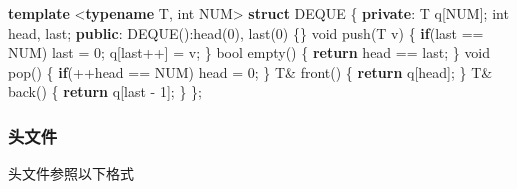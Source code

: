 \documentclass[
]{article}
\newenvironment{Shaded}{}{}
\newcommand{\ControlFlowTok}[1]{\textcolor[rgb]{0.00,0.44,0.13}{\textbf{#1}}}
\newcommand{\DataTypeTok}[1]{\textcolor[rgb]{0.56,0.13,0.00}{#1}}
\newcommand{\DecValTok}[1]{\textcolor[rgb]{0.25,0.63,0.44}{#1}}
\newcommand{\KeywordTok}[1]{\textcolor[rgb]{0.00,0.44,0.13}{\textbf{#1}}}
\newcommand{\NormalTok}[1]{#1}
\newcommand{\OperatorTok}[1]{\textcolor[rgb]{0.40,0.40,0.40}{#1}}
\begin{document}
\begin{Shaded}
\begin{Highlighting}[]
\KeywordTok{template} \OperatorTok{\textless{}}\KeywordTok{typename}\NormalTok{ T}\OperatorTok{,} \DataTypeTok{int}\NormalTok{ NUM}\OperatorTok{\textgreater{}} \KeywordTok{struct}\NormalTok{ DEQUE }\OperatorTok{\{}
\KeywordTok{private}\OperatorTok{:}
\NormalTok{    T q}\OperatorTok{[}\NormalTok{NUM}\OperatorTok{];} \DataTypeTok{int}\NormalTok{ head}\OperatorTok{,}\NormalTok{ last}\OperatorTok{;}
\KeywordTok{public}\OperatorTok{:}
\NormalTok{    DEQUE}\OperatorTok{():}\NormalTok{head}\OperatorTok{(}\DecValTok{0}\OperatorTok{),}\NormalTok{ last}\OperatorTok{(}\DecValTok{0}\OperatorTok{)} \OperatorTok{\{\}}
    \DataTypeTok{void}\NormalTok{ push}\OperatorTok{(}\NormalTok{T v}\OperatorTok{)} \OperatorTok{\{}
        \ControlFlowTok{if}\OperatorTok{(}\NormalTok{last }\OperatorTok{==}\NormalTok{ NUM}\OperatorTok{)}\NormalTok{ last }\OperatorTok{=} \DecValTok{0}\OperatorTok{;}
\NormalTok{        q}\OperatorTok{[}\NormalTok{last}\OperatorTok{++]} \OperatorTok{=}\NormalTok{ v}\OperatorTok{;}
    \OperatorTok{\}}
    \DataTypeTok{bool}\NormalTok{ empty}\OperatorTok{()} \OperatorTok{\{} \ControlFlowTok{return}\NormalTok{ head }\OperatorTok{==}\NormalTok{ last}\OperatorTok{;} \OperatorTok{\}}
    \DataTypeTok{void}\NormalTok{ pop}\OperatorTok{()} \OperatorTok{\{} \ControlFlowTok{if}\OperatorTok{(++}\NormalTok{head }\OperatorTok{==}\NormalTok{ NUM}\OperatorTok{)}\NormalTok{ head }\OperatorTok{=} \DecValTok{0}\OperatorTok{;} \OperatorTok{\}}
\NormalTok{    T}\OperatorTok{\&}\NormalTok{ front}\OperatorTok{()} \OperatorTok{\{} \ControlFlowTok{return}\NormalTok{ q}\OperatorTok{[}\NormalTok{head}\OperatorTok{];} \OperatorTok{\}}
\NormalTok{    T}\OperatorTok{\&}\NormalTok{ back}\OperatorTok{()} \OperatorTok{\{} \ControlFlowTok{return}\NormalTok{ q}\OperatorTok{[}\NormalTok{last }\OperatorTok{{-}} \DecValTok{1}\OperatorTok{];} \OperatorTok{\}}
\OperatorTok{\};}
\end{Highlighting}
\end{Shaded}

\hypertarget{ux5934ux6587ux4ef6}{%
\subsubsection{头文件}\label{ux5934ux6587ux4ef6}}

头文件参照以下格式
\end{document}
